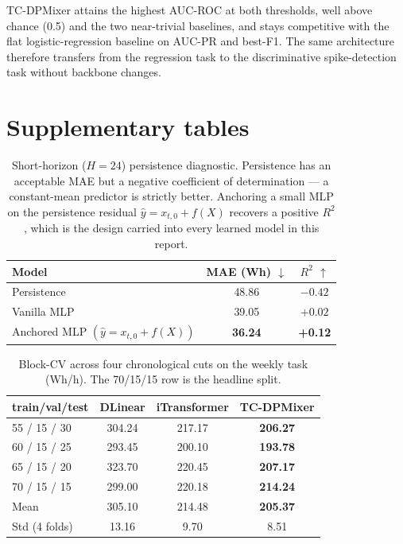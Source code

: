 \documentclass{article}
\begin{document}
TC-DPMixer attains the highest AUC-ROC at both thresholds, well above
chance (0.5) and the two near-trivial baselines, and stays competitive
with the flat logistic-regression baseline on AUC-PR and best-F1. The
same architecture therefore transfers from the regression task to the
discriminative spike-detection task without backbone changes.


\section{Supplementary tables}
\label{si:tables}

\begin{table}[h]
\centering
\caption{Short-horizon ($H{=}24$) persistence diagnostic. Persistence
  has an acceptable MAE but a negative coefficient of determination
  --- a constant-mean predictor is strictly better. Anchoring a small
  MLP on the persistence residual $\hat{y}=x_{t,0}+f(X)$ recovers a
  positive $R^{2}$, which is the design carried into every learned
  model in this report.}
\label{tab:persr2}
\small
\begin{tabular}{lcc}
\toprule
Model & MAE (Wh) $\downarrow$ & $R^{2}$ $\uparrow$ \\
\midrule
Persistence       & 48.86 & $-0.42$ \\
Vanilla MLP       & 39.05 & $+0.02$ \\
Anchored MLP $(\hat{y}=x_{t,0}+f(X))$ & \textbf{36.24} & \textbf{+0.12} \\
\bottomrule
\end{tabular}
\end{table}

\begin{table}[h]
\centering
\caption{Block-CV across four chronological cuts on the weekly task
(Wh/h). The 70/15/15 row is the headline split.}
\label{tab:blockcv}
\small
\begin{tabular}{lccc}
\toprule
train/val/test & DLinear & iTransformer & TC-DPMixer \\
\midrule
55 / 15 / 30 & 304.24 & 217.17 & \textbf{206.27} \\
60 / 15 / 25 & 293.45 & 200.10 & \textbf{193.78} \\
65 / 15 / 20 & 323.70 & 220.45 & \textbf{207.17} \\
70 / 15 / 15 & 299.00 & 220.18 & \textbf{214.24} \\
\midrule
Mean         & 305.10 & 214.48 & \textbf{205.37} \\
Std (4 folds)& 13.16  & 9.70   & 8.51 \\
\bottomrule
\end{tabular}
\end{table}
\end{document}
